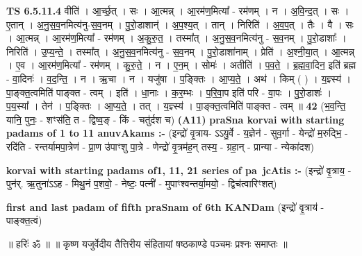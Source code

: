 \documentclass[17pt]{extarticle}
\begin{document}
                  \newline
                                \textbf{ TS 6.5.11.4} \newline
                  वीति॑ । आ॒र्च्छ॒त् । सः । आ॒त्मन्न् । आ॒रम॑ण॒मित्या᳚ - रम॑णम् । न । अ॒वि॒न्द॒त् । सः । ए॒तान् । अ॒नु॒स॒व॒नमित्य॑नु-स॒व॒नम् । पु॒रो॒डाशान्॑ । अ॒प॒श्य॒त् । तान् । निरिति॑ । अ॒व॒प॒त् । तैः । वै । सः । आ॒त्मन्न् । आ॒रम॑ण॒मित्या᳚ - रम॑णम् । अ॒कु॒रु॒त॒ । तस्मा᳚त् । अ॒नु॒स॒व॒नमित्य॑नु - स॒व॒नम् । पु॒रो॒डाशाः᳚ । निरिति॑ । उ॒प्य॒न्ते॒ । तस्मा᳚त् । अ॒नु॒स॒व॒नमित्य॑नु - स॒व॒नम् । पु॒रो॒डाशा॑नाम् । प्रेति॑ । अ॒श्नी॒या॒त् । आ॒त्मन्न् । ए॒व । आ॒रम॑ण॒मित्या᳚ - रम॑णम् । कु॒रु॒ते॒ । न । ए॒न॒म् । सोमः॑ । अतीति॑ । प॒व॒ते॒ । ब्र॒ह्म॒वा॒दिन॒ इति॑ ब्रह्म - वा॒दिनः॑ । व॒द॒न्ति॒ । न । ऋ॒चा । न । यजु॑षा । प॒ङ्क्तिः । आ॒प्य॒ते॒ । अथ॑ । किम् ( ) । य॒ज्ञ्स्य॑ । पा॒ङ्क्त॒त्वमिति॑ पाङ्क्त - त्वम् । इति॑ । धा॒नाः । क॒र॒म्भः । प॒रि॒वा॒प इति॑ परि - वा॒पः । पु॒रो॒डाशः॑ । प॒य॒स्या᳚ । तेन॑ । प॒ङ्क्तिः । आ॒प्य॒ते॒ । तत् । य॒ज्ञ्स्य॑ । पा॒ङ्क्त॒त्वमिति॑ पाङ्क्त - त्वम् ॥ \textbf{  42 } \newline
                  \newline
                      (भ॒व॒न्ति॒ यानि॒ पुनः॒ - शꣳस॑ति॒ त - द्विष्व॒ङ् - किं - चतु॑र्दश च)  \textbf{(A11)} \newline \newline
\textbf{praSna korvai with starting padams of 1 to 11 anuvAkams :-} \newline
(इन्द्रो॑ वृ॒त्राय- ऽऽयु॒र्वे - य॒ज्ञेन॑ - सुव॒र्गा - येन्द्रो॑ म॒रुद्भि॒ - रदि॑ति - रन्तर्यामपा॒त्रेण॑ - प्रा॒ण उ॑पाꣳशु पा॒त्रे - णेन्द्रो॑ वृ॒त्रम॑ह॒॒न् तस्य॒ - ग्रहा॒न् - प्रान्या - न्येका॑दश) \newline

\textbf{korvai with starting padams of1, 11, 21 series of pa~jcAtis :-} \newline
(इन्द्रो॑ वृ॒त्राय॒ - पुन॑र्. ऋ॒तुना॑ऽऽह - मिथु॒नं प॒शवो॒ - नेष्टः॒ पत्नी॑ - मुपाꣳश्वन्तर्या॒मयो॒ - द्विच॑त्वारिꣳशत्) \newline

\textbf{first and last padam of fifth praSnam of 6th KANDam} \newline
(इन्द्रो॑ वृ॒त्राय॑ - पाङ्क्त॒त्वं) \newline 


॥ हरिः॑ ॐ ॥
॥ कृष्ण यजुर्वेदीय तैत्तिरीय संहितायां षष्ठकाण्डे पञ्चमः प्रश्नः समाप्तः ॥ \newline
\pagebreak
\pagebreak
        
\end{document}
